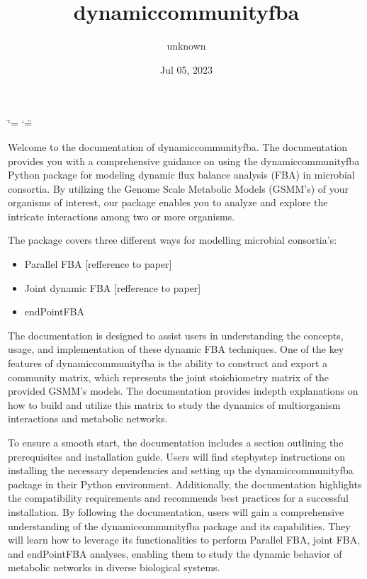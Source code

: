 \documentclass[letterpaper,10pt,english]{sphinxmanual}
\title{dynamic\sphinxhyphen{}community\sphinxhyphen{}fba}
\date{Jul 05, 2023}
\author{unknown}
\begin{document}
\ifdefined\shorthandoff
  \ifnum\catcode`\=\string=\active\shorthandoff{=}\fi
  \ifnum\catcode`\"=\active{}\fi
\fi

\pagestyle{empty}
\sphinxmaketitle
\pagestyle{plain}
\sphinxtableofcontents
\pagestyle{normal}
\label{\detokenize{index::doc}}


\sphinxAtStartPar
Welcome to the documentation of dynamic\sphinxhyphen{}community\sphinxhyphen{}fba. The documentation provides you with a comprehensive guidance on using the dynamic\sphinxhyphen{}community\sphinxhyphen{}fba Python package for modeling dynamic flux balance analysis (FBA) in microbial consortia. By utilizing the Genome Scale Metabolic Models (GSMM’s) of your organisms of interest, our package enables you to analyze and explore the intricate interactions among two or more organisms.

\sphinxAtStartPar
The package covers three different ways for modelling microbial consortia’s:
\begin{itemize}
\item {} 
\sphinxAtStartPar
Parallel FBA {[}refference to paper{]}

\item {} 
\sphinxAtStartPar
Joint dynamic FBA {[}refference to paper{]}

\item {} 
\sphinxAtStartPar
endPointFBA

\end{itemize}

\sphinxAtStartPar
The documentation is designed to assist users in understanding the concepts, usage, and implementation of these dynamic FBA techniques. One of the key features of dynamic\sphinxhyphen{}community\sphinxhyphen{}fba is the ability to construct and export a community matrix, which represents the joint stoichiometry matrix of the provided GSMM’s models. The documentation provides in\sphinxhyphen{}depth explanations on how to build and utilize this matrix to study the dynamics of multi\sphinxhyphen{}organism interactions and metabolic networks.

\sphinxAtStartPar
To ensure a smooth start, the documentation includes a section outlining the prerequisites and installation guide. Users will find step\sphinxhyphen{}by\sphinxhyphen{}step instructions on installing the necessary dependencies and setting up the dynamic\sphinxhyphen{}community\sphinxhyphen{}fba package in their Python environment. Additionally, the documentation highlights the compatibility requirements and recommends best practices for a successful installation.
By following the documentation, users will gain a comprehensive understanding of the dynamic\sphinxhyphen{}community\sphinxhyphen{}fba package and its capabilities. They will learn how to leverage its functionalities to perform Parallel FBA, joint FBA, and endPointFBA analyses, enabling them to study the dynamic behavior of metabolic networks in diverse biological systems.
\end{document}
